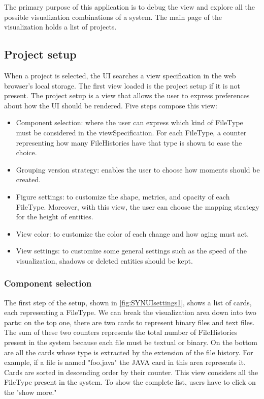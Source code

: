 The primary purpose of this application is to debug the view and explore all the possible visualization combinations of a system.
The main page of the visualization holds a list of projects.

\subsection*{Project setup}
When a project is selected, the UI searches a view specification in the web browser's local storage. 
The first view loaded is the project setup if it is not present.
The project setup is a view that allows the user to express preferences about how the UI should be rendered. 
Five steps compose this view:
\begin{itemize}
    \item Component selection: where the user can express which kind of FileType must be considered in the viewSpecification. 
    For each FileType, a counter representing how many FileHistories have that type is shown to ease the choice. 
    \item Grouping version strategy: enables the user to choose how moments should be created.
    \item Figure settings: to customize the shape, metrics, and opacity of each FileType. Moreover, with this view, the user can choose the mapping strategy for the height of entities. 
    \item View color: to customize the color of each change and how aging must act. 
    \item View settings: to customize some general settings such as the speed of the visualization, shadows or deleted entities should be kept. 
\end{itemize}

\subsubsection*{Component selection}
The first step of the setup, shown in \autoref{fig:SYNUIsettings1}, shows a list of cards, each representing a FileType. 
We can break the visualization area down into two parts: on the top one, there are two cards to represent binary files and text files. 
The sum of these two counters represents the total number of FileHistories present in the system because each file must be textual or binary. 
On the bottom are all the cards whose type is extracted by the extension of the file history. For example, if a file is named "foo.java" the JAVA card in this area represents it. 
Cards are sorted in descending order by their counter. This view considers all the FileType present in the system. To show the complete list, users have to click on the "show more."

